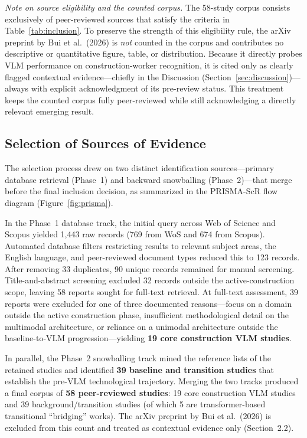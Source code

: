 \documentclass[10pt,letterpaper]{article}
\begin{document}
\textit{Note on source eligibility and the counted corpus.} The 58-study corpus consists exclusively of peer-reviewed sources that satisfy the criteria in Table~\ref{tab:inclusion}. To preserve the strength of this eligibility rule, the arXiv preprint by Bui et al.\ (2026) is \emph{not} counted in the corpus and contributes no descriptive or quantitative figure, table, or distribution. Because it directly probes VLM performance on construction-worker recognition, it is cited only as clearly flagged contextual evidence---chiefly in the Discussion (Section~\ref{sec:discussion})---always with explicit acknowledgment of its pre-review status. This treatment keeps the counted corpus fully peer-reviewed while still acknowledging a directly relevant emerging result.

\subsection{Selection of Sources of Evidence}

The selection process drew on two distinct identification sources---primary database retrieval (Phase~1) and backward snowballing (Phase~2)---that merge before the final inclusion decision, as summarized in the PRISMA-ScR flow diagram (Figure~\ref{fig:prisma}).

In the Phase~1 database track, the initial query across Web of Science and Scopus yielded 1{,}443 raw records (769 from WoS and 674 from Scopus). Automated database filters restricting results to relevant subject areas, the English language, and peer-reviewed document types reduced this to 123 records. After removing 33 duplicates, 90 unique records remained for manual screening. Title-and-abstract screening excluded 32 records outside the active-construction scope, leaving 58 reports sought for full-text retrieval. At full-text assessment, 39 reports were excluded for one of three documented reasons---focus on a domain outside the active construction phase, insufficient methodological detail on the multimodal architecture, or reliance on a unimodal architecture outside the baseline-to-VLM progression---yielding \textbf{19 core construction VLM studies}.

In parallel, the Phase~2 snowballing track mined the reference lists of the retained studies and identified \textbf{39 baseline and transition studies} that establish the pre-VLM technological trajectory. Merging the two tracks produced a final corpus of \textbf{58 peer-reviewed studies}: 19 core construction VLM studies and 39 background/transition studies (of which 5 are transformer-based transitional ``bridging'' works). The arXiv preprint by Bui et al.\ (2026) is excluded from this count and treated as contextual evidence only (Section~2.2).
\end{document}
